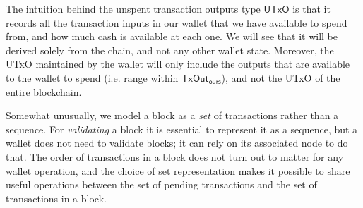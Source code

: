 \documentclass{article}
\numberwithin{equation}{lemma}
\begin{document}
The intuition behind the unspent transaction outputs type $\mathsf{UTxO}$ is
that it records all the transaction inputs in our wallet that we have available
to spend from, and how much cash is available at each one. We will see that it
will be derived solely from the chain, and not any other wallet state. Moreover,
the UTxO maintained by the wallet will only include the outputs that are
available to the wallet to spend (i.e. range within $\mathsf{TxOut_{ours}}$),
and not the UTxO of the entire blockchain.

Somewhat unusually, we model a block as a \emph{set} of transactions rather than
a sequence. For \emph{validating} a block it is essential to represent it as a
sequence, but a wallet does not need to validate blocks; it can rely on its
associated node to do that. The order of transactions in a block does not turn
out to matter for any wallet operation, and the choice of set representation
makes it possible to share useful operations between the set of pending
transactions and the set of transactions in a block.
\end{document}
